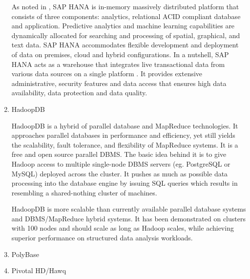 \begin{enumerate}
As noted in \label{\detokenize{i524/technologies:id228}}{\hyperref[\detokenize{i524/technologies:www-sap-hana}]{\sphinxcrossref{{[}191{]}}}}, SAP HANA is in-memory massively
distributed platform that consists of three components:
analytics, relational ACID compliant database and
application. Predictive analytics and machine learning
capabilities are dynamically allocated for searching and
processing of spatial, graphical, and text data.
SAP HANA accommodates flexible development and deployment of
data on premises, cloud and hybrid configurations.  In a
nutshell, SAP HANA acts as a warehouse that integrates live
transactional data from various data sources on a single
platform \label{\detokenize{i524/technologies:id229}}{\hyperref[\detokenize{i524/technologies:olofson-2014}]{\sphinxcrossref{{[}192{]}}}}. It provides extensive
administrative, security features and data access that ensures
high data availability, data protection and data quality.

\item {} 
HadoopDB

HadoopDB is a hybrid of parallel database and MapReduce
technologies. It approaches parallel databases in performance and
efficiency, yet still yields the scalability, fault tolerance,
and flexibility of MapReduce systems. It is a free and open
source parallel DBMS. The basic idea behind it is to give Hadoop
access to multiple single-node DBMS servers (eg. PostgreSQL or
MySQL) deployed across the cluster. It pushes as much as possible
data processing into the database engine by issuing SQL queries
which results in resembling a shared-nothing cluster of
machines. \label{\detokenize{i524/technologies:id230}}{\hyperref[\detokenize{i524/technologies:www-hadoopdb}]{\sphinxcrossref{{[}193{]}}}}

HadoopDB is more scalable than currently available parallel
database systems and DBMS/MapReduce hybrid systems. It has been
demonstrated on clusters with 100 nodes and should scale as long
as Hadoop scales, while achieving superior performance on
structured data analysis workloads.

\item {} 
PolyBase

\item {} 
Pivotal HD/Hawq


\end{enumerate}
